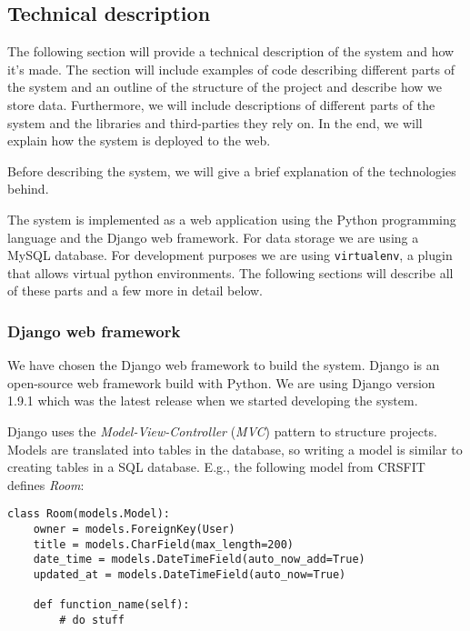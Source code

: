 \subsection{Technical description}


The following section will provide a technical description of the system and how it's made. The section will include examples of code describing different parts of the system and an outline of the structure of the project and describe how we store data. Furthermore, we will include descriptions of different parts of the system and the libraries and third-parties they rely on. In the end, we will explain how the system is deployed to the web.

Before describing the system, we will give a brief explanation of the technologies behind.

The system is implemented as a web application using the Python programming language and the Django web framework. For data storage we are using a MySQL database.
For development purposes we are using \texttt{virtualenv}, a plugin that allows virtual python environments. The following sections will describe all of these parts and a few more in detail below.

\subsubsection*{Django web framework}
We have chosen the Django web framework to build the system. Django is an open-source web framework build with Python. We are using Django version 1.9.1 which was the latest release when we started developing the system.

Django uses the \emph{Model-View-Controller} (\emph{MVC}) pattern to structure projects. %
Models are translated into tables in the database, so writing a model is similar to creating tables in a SQL database. E.g., the following model from CRSFIT defines \emph{Room}: 

\begin{lstlisting}[caption=The Room Class, label=lst:room-class]
class Room(models.Model):
    owner = models.ForeignKey(User)
    title = models.CharField(max_length=200)
    date_time = models.DateTimeField(auto_now_add=True)
    updated_at = models.DateTimeField(auto_now=True)
    
    def function_name(self):
        # do stuff
\end{lstlisting}




